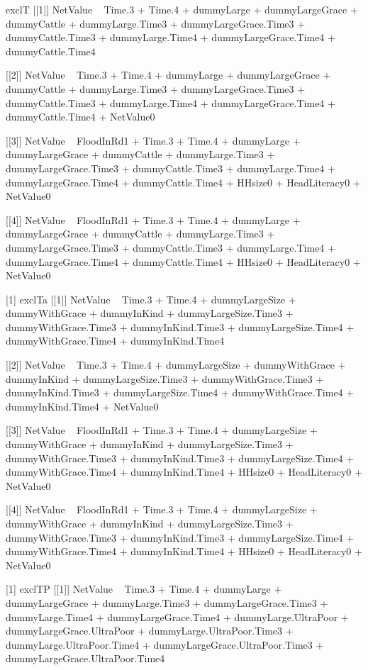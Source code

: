 \begin{Schunk}
\begin{Soutput}
[1] exclT
[[1]]
NetValue ~ Time.3 + Time.4 + dummyLarge + dummyLargeGrace + dummyCattle + 
    dummyLarge.Time3 + dummyLargeGrace.Time3 + dummyCattle.Time3 + 
    dummyLarge.Time4 + dummyLargeGrace.Time4 + dummyCattle.Time4

[[2]]
NetValue ~ Time.3 + Time.4 + dummyLarge + dummyLargeGrace + dummyCattle + 
    dummyLarge.Time3 + dummyLargeGrace.Time3 + dummyCattle.Time3 + 
    dummyLarge.Time4 + dummyLargeGrace.Time4 + dummyCattle.Time4 + 
    NetValue0

[[3]]
NetValue ~ FloodInRd1 + Time.3 + Time.4 + dummyLarge + dummyLargeGrace + 
    dummyCattle + dummyLarge.Time3 + dummyLargeGrace.Time3 + 
    dummyCattle.Time3 + dummyLarge.Time4 + dummyLargeGrace.Time4 + 
    dummyCattle.Time4 + HHsize0 + HeadLiteracy0 + NetValue0

[[4]]
NetValue ~ FloodInRd1 + Time.3 + Time.4 + dummyLarge + dummyLargeGrace + 
    dummyCattle + dummyLarge.Time3 + dummyLargeGrace.Time3 + 
    dummyCattle.Time3 + dummyLarge.Time4 + dummyLargeGrace.Time4 + 
    dummyCattle.Time4 + HHsize0 + HeadLiteracy0 + NetValue0

[1] exclTa
[[1]]
NetValue ~ Time.3 + Time.4 + dummyLargeSize + dummyWithGrace + 
    dummyInKind + dummyLargeSize.Time3 + dummyWithGrace.Time3 + 
    dummyInKind.Time3 + dummyLargeSize.Time4 + dummyWithGrace.Time4 + 
    dummyInKind.Time4

[[2]]
NetValue ~ Time.3 + Time.4 + dummyLargeSize + dummyWithGrace + 
    dummyInKind + dummyLargeSize.Time3 + dummyWithGrace.Time3 + 
    dummyInKind.Time3 + dummyLargeSize.Time4 + dummyWithGrace.Time4 + 
    dummyInKind.Time4 + NetValue0

[[3]]
NetValue ~ FloodInRd1 + Time.3 + Time.4 + dummyLargeSize + dummyWithGrace + 
    dummyInKind + dummyLargeSize.Time3 + dummyWithGrace.Time3 + 
    dummyInKind.Time3 + dummyLargeSize.Time4 + dummyWithGrace.Time4 + 
    dummyInKind.Time4 + HHsize0 + HeadLiteracy0 + NetValue0

[[4]]
NetValue ~ FloodInRd1 + Time.3 + Time.4 + dummyLargeSize + dummyWithGrace + 
    dummyInKind + dummyLargeSize.Time3 + dummyWithGrace.Time3 + 
    dummyInKind.Time3 + dummyLargeSize.Time4 + dummyWithGrace.Time4 + 
    dummyInKind.Time4 + HHsize0 + HeadLiteracy0 + NetValue0

[1] exclTP
[[1]]
NetValue ~ Time.3 + Time.4 + dummyLarge + dummyLargeGrace + dummyLarge.Time3 + 
    dummyLargeGrace.Time3 + dummyLarge.Time4 + dummyLargeGrace.Time4 + 
    dummyLarge.UltraPoor + dummyLargeGrace.UltraPoor + dummyLarge.UltraPoor.Time3 + 
    dummyLarge.UltraPoor.Time4 + dummyLargeGrace.UltraPoor.Time3 + 
    dummyLargeGrace.UltraPoor.Time4


\end{Soutput}
\end{Schunk}

